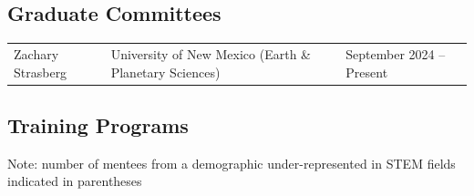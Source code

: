 \documentclass{article}[12pt]
\begin{document}
	\subsection*{Graduate Committees}
	
	
	
	
	\vspace{-0.5em}
	\begin{tabularx}{\textwidth}{lXl}
		Zachary Strasberg & University of New Mexico (Earth \& Planetary Sciences) & September 2024 -- Present 
	\end{tabularx}
	
	\subsection*{Training Programs}
	Note: number of mentees from a demographic under-represented in STEM fields indicated in parentheses
	
	
	
\end{document}
